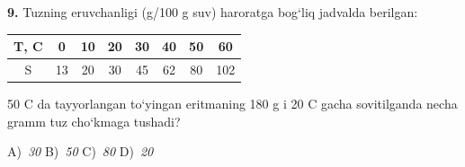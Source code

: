 \documentclass[11pt,a4paper]{article}
\begin{document}
\noindent\textbf{9.} Tuzning eruvchanligi (g/100 g suv) haroratga bog`liq jadvalda berilgan:
\begin{center}
\renewcommand{\arraystretch}{1.15}
\begin{tabular}{|c|c|c|c|c|c|c|c|}\hline
\textbf{T, \textdegree{}C} & \textbf{0} & \textbf{10} & \textbf{20} & \textbf{30} & \textbf{40} & \textbf{50} & \textbf{60} \\ \hline
S & 13 & 20 & 30 & 45 & 62 & 80 & 102 \\ \hline
\end{tabular}
\end{center}
50 \textdegree{}C da tayyorlangan to`yingan eritmaning 180 g i 20 \textdegree{}C gacha sovitilganda necha gramm tuz cho`kmaga tushadi?

\noindent A)~\textsl{30} \hfill B)~\textsl{50} \hfill C)~\textsl{80} \hfill D)~\textsl{20}\par
\vspace{4pt}
\end{document}
